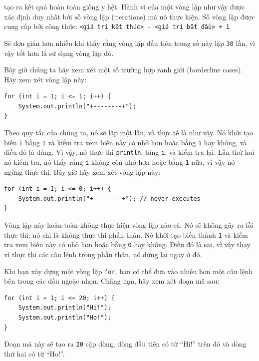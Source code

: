 tạo ra kết quả hoàn toàn giống y hệt. Hành vi của một vòng lặp như vậy
được xác định duy nhất bởi số vòng lặp (iterations) mà nó thực hiện. Số
vòng lặp được cung cấp bởi công thức:
\texttt{\textless{}giá\ trị\ kết\ thúc\textgreater{}\ -\ \textless{}giá\ trị\ bắt\ đầu\textgreater{}\ +\ 1}

Sẽ đơn giản hơn nhiều khi thấy rằng vòng lặp đầu tiên trong số này lặp
\texttt{30} lần, vì vậy tốt hơn là sử dụng vòng lặp đó.

Bây giờ chúng ta hãy xem xét một số trường hợp ranh giới (borderline
cases). Hãy xem xét vòng lặp này:

\begin{verbatim}
for (int i = 1; i <= 1; i++) {
    System.out.println("+--------+");
}
\end{verbatim}

Theo quy tắc của chúng ta, nó sẽ lặp một lần, và thực tế là như vậy. Nó
khởi tạo biến \texttt{i} bằng \texttt{1} và kiểm tra xem biến này có nhỏ
hơn hoặc bằng \texttt{1} hay không, và điều đó là đúng. Vì vậy, nó thực
thi \texttt{println}, tăng \texttt{i}, và kiểm tra lại. Lần thứ hai nó
kiểm tra, nó thấy rằng \texttt{i} không còn nhỏ hơn hoặc bằng \texttt{1}
nữa, vì vậy nó ngừng thực thi. Bây giờ hãy xem xét vòng lặp này:

\begin{verbatim}
for (int i = 1; i <= 0; i++) {
    System.out.println("+--------+"); // never executes
}
\end{verbatim}

Vòng lặp này hoàn toàn không thực hiện vòng lặp nào cả. Nó sẽ không gây
ra lỗi thực thi; nó chỉ là không thực thi phần thân. Nó khởi tạo biến
thành \texttt{1} và kiểm tra xem biến này có nhỏ hơn hoặc bằng
\texttt{0} hay không. Điều đó là sai, vì vậy thay vì thực thi các câu
lệnh trong phần thân, nó dừng lại ngay ở đó.

Khi bạn xây dựng một vòng lặp \texttt{for}, bạn có thể đưa vào nhiều hơn
một câu lệnh bên trong các dấu ngoặc nhọn. Chẳng hạn, hãy xem xét đoạn
mã sau:

\begin{verbatim}
for (int i = 1; i <= 20; i++) {
    System.out.println("Hi!");
    System.out.println("Ho!");
}
\end{verbatim}

Đoạn mã này sẽ tạo ra \texttt{20} cặp dòng, dòng đầu tiên có từ ``Hi!''
trên đó và dòng thứ hai có từ ``Ho!''.

